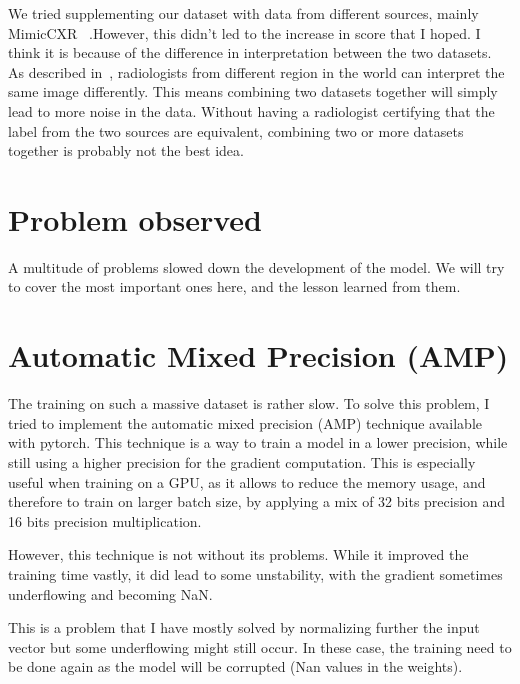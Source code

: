 \documentclass[11pt]{article}
\begin{document}
        We tried supplementing our dataset with data from different sources, mainly MimicCXR~\cite{mimic-cxr} .However, this didn't led to the increase in score that I hoped. I think it is because of the difference
        in interpretation between the two datasets. As described in~\cite{cross-bias}, radiologists from different region in the world can interpret the same image differently. This means combining two datasets together
        will simply lead to more noise in the data. Without having a radiologist certifying that the label from the two sources are equivalent, combining two or more datasets together is probably not the best idea.

    \section{Problem observed}

    A multitude of problems slowed down the development of the model. We will try to cover the most
    important ones here, and the lesson learned from them.

    \section{Automatic Mixed Precision (AMP)}
            The training on such a massive dataset is rather slow. To solve this problem, I tried to implement the automatic mixed precision (AMP) technique available with pytorch. This technique is a way to train a model in a lower precision, while still using a higher precision for the gradient computation.
            This is especially useful when training on a GPU, as it allows to reduce the memory usage, and therefore to train on larger batch size, by applying a mix
            of 32 bits precision and 16 bits precision multiplication.

            However, this technique is not without its problems. While it improved the training time vastly,
            it did lead to some unstability, with the gradient sometimes underflowing and becoming NaN.

            This is a problem that I have mostly solved by normalizing further the input vector but some
            underflowing might still occur. In these case, the training need to be done
            again as the model will be corrupted (Nan values in the weights).
\end{document}
